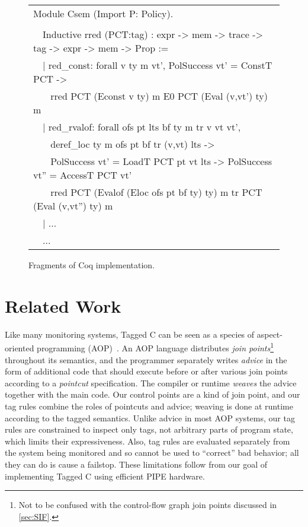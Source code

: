 \documentclass{llncs}
\begin{document}
\begin{figure}[t]
{    \begin{tabular}{l}
      Module Csem (Import P: Policy). \\
      \\
      \ \ Inductive rred (PCT:tag) : expr -> mem -> trace -> tag -> expr -> mem -> Prop := \\
      \ \ | red\_const: forall v ty m vt', PolSuccess vt' = ConstT PCT -> \\
      \ \ ~ rred PCT (Econst v ty) m E0 PCT (Eval (v,vt') ty) m \\
      \ \ | red\_rvalof: forall ofs pt lts bf ty m tr v vt vt', \\
      \ \ ~ deref\_loc ty m ofs pt bf tr (v,vt) lts -> \\
      \ \ ~ PolSuccess vt' = LoadT PCT pt vt lts -> PolSuccess vt'' = AccessT PCT vt' \\
      \ \ ~ rred PCT (Evalof (Eloc ofs pt bf ty) ty) m tr PCT (Eval (v,vt'') ty) m \\
      \ \ | ...\\
      \ \ ...
      \end{tabular} }
    
  \caption{Fragments of Coq implementation.}
  \label{fig:fullcode}
\end{figure}

\section{Related Work}
\label{sec:related}

Like many monitoring systems, Tagged C can be seen as a species of 
aspect-oriented programming (AOP)~\cite{Kiczales97:AOP}. %
An AOP language distributes {\em join points}\footnote{Not to be confused with the control-flow graph
join points discussed in \cref{sec:SIF}.} throughout its semantics, 
and the programmer separately writes {\em advice} in the form of
additional code that should execute before or after various join points according to
a {\em pointcut} specification. The compiler or runtime 
{\em weaves} the advice together with the main code.
Our control points are a kind of join point, and our tag rules combine the roles of pointcuts and advice; weaving
is done at runtime according to the tagged semantics. Unlike advice in most AOP systems, our
tag rules are constrained to inspect only tags, not arbitrary parts of program state, which limits their expressiveness. 
Also, tag rules are evaluated separately from the system being monitored and so cannot be used to ``correct'' bad
behavior; all they can do is cause a failstop.  
These limitations follow from our goal of implementing Tagged C using efficient PIPE hardware. 
\end{document}

